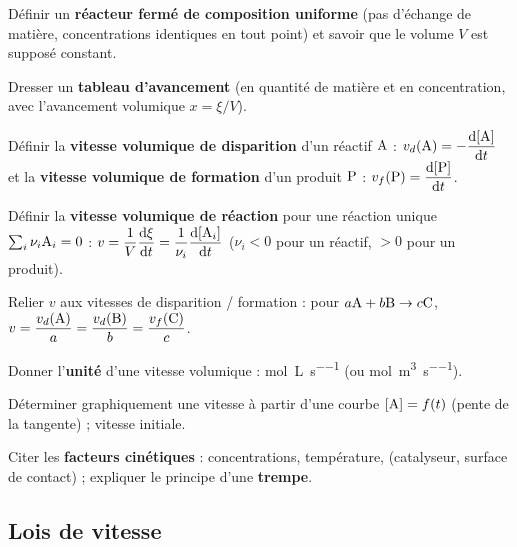 \documentclass[11pt,a4paper]{article}
\newcommand{\conc}[1]{[\ce{#1}]}
\begin{document}
\begin{savoir}
  \item Définir un \textbf{réacteur fermé de composition uniforme} (pas d'échange de matière,
        concentrations identiques en tout point) et savoir que le volume $V$ est supposé constant.
  \item Dresser un \textbf{tableau d'avancement} (en quantité de matière et en concentration,
        avec l'avancement volumique $x=\xi/V$).
  \item Définir la \textbf{vitesse volumique de disparition} d'un réactif $\ce{A}$ :
        $v_{d}(\ce{A}) = -\dfrac{\mathrm{d}\conc{A}}{\mathrm{d}t}$ et la \textbf{vitesse volumique de
        formation} d'un produit $\ce{P}$ : $v_{f}(\ce{P}) = \dfrac{\mathrm{d}\conc{P}}{\mathrm{d}t}$.
  \item Définir la \textbf{vitesse volumique de réaction} pour une réaction unique
        $\sum_i \nu_i \ce{A_i} = 0$ :
        $v = \dfrac{1}{V}\dfrac{\mathrm{d}\xi}{\mathrm{d}t} = \dfrac{1}{\nu_i}\dfrac{\mathrm{d}\conc{A_i}}{\mathrm{d}t}$
        ($\nu_i<0$ pour un réactif, $>0$ pour un produit).
  \item Relier $v$ aux vitesses de disparition / formation :
        pour $a\ce{A} + b\ce{B} \to c\ce{C}$,
        $v = \dfrac{v_d(\ce{A})}{a} = \dfrac{v_d(\ce{B})}{b} = \dfrac{v_f(\ce{C})}{c}$.
  \item Donner l'\textbf{unité} d'une vitesse volumique : \si{\mol\per\liter\per\second}
        (ou \si{\mol\per\cubic\metre\per\second}).
  \item Déterminer graphiquement une vitesse à partir d'une courbe $\conc{A}=f(t)$
        (pente de la tangente) ; vitesse initiale.
  \item Citer les \textbf{facteurs cinétiques} : concentrations, température, (catalyseur, surface de
        contact) ; expliquer le principe d'une \textbf{trempe}.
\end{savoir}

\subsection{Lois de vitesse}
\end{document}
